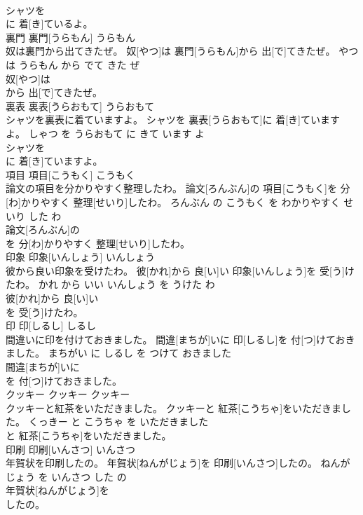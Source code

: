 \documentclass[8pt]{extreport}
\begin{document}
\begin{CJK}{UTF8}{min}
\\	シャツを
\\	に 着[き]ているよ。			
\\	裏門	裏門[うらもん]	うらもん	
\\	奴は裏門から出てきたぜ。	奴[やつ]は 裏門[うらもん]から 出[で]てきたぜ。	やつ は うらもん から でて きた ぜ	
\\	奴[やつ]は
\\	から 出[で]てきたぜ。			
\\	裏表	裏表[うらおもて]	うらおもて	
\\	シャツを裏表に着ていますよ。	シャツを 裏表[うらおもて]に 着[き]ていますよ。	しゃつ を うらおもて に きて います よ	
\\	シャツを
\\	に 着[き]ていますよ。			
\\	項目	項目[こうもく]	こうもく	
\\	論文の項目を分かりやすく整理したわ。	論文[ろんぶん]の 項目[こうもく]を 分[わ]かりやすく 整理[せいり]したわ。	ろんぶん の こうもく を わかりやすく せいり した わ	
\\	論文[ろんぶん]の
\\	を 分[わ]かりやすく 整理[せいり]したわ。			
\\	印象	印象[いんしょう]	いんしょう	
\\	彼から良い印象を受けたわ。	彼[かれ]から 良[い]い 印象[いんしょう]を 受[う]けたわ。	かれ から いい いんしょう を うけた わ	
\\	彼[かれ]から 良[い]い
\\	を 受[う]けたわ。			
\\	印	印[しるし]	しるし	
\\	間違いに印を付けておきました。	間違[まちが]いに 印[しるし]を 付[つ]けておきました。	まちがい に しるし を つけて おきました	
\\	間違[まちが]いに
\\	を 付[つ]けておきました。			
\\	クッキー	クッキー	クッキー	
\\	クッキーと紅茶をいただきました。	クッキーと 紅茶[こうちゃ]をいただきました。	くっきー と こうちゃ を いただきました	
\\	と 紅茶[こうちゃ]をいただきました。			
\\	印刷	印刷[いんさつ]	いんさつ	
\\	年賀状を印刷したの。	年賀状[ねんがじょう]を 印刷[いんさつ]したの。	ねんがじょう を いんさつ した の	
\\	年賀状[ねんがじょう]を
\\	したの。			

\end{CJK}
\end{document}
